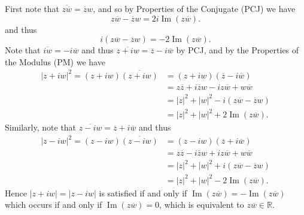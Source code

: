 \documentclass[11pt]{article}
\def\reals{\mathbb{R}}
\renewcommand{\Im}{\operatorname{Im}}
\newcommand{\abs}[1]{\left|#1\right|}
\begin{document}
\begin{enumerate}
 \begin{Solution}
  First note that $\overline{z\overline{w}} = \overline{z}w$, and so by Properties of the Conjugate (PCJ) we have
  \[
   z\overline{w} - \overline{z}w = 2i\Im(z\overline{w}).
  \]
  and thus 
  \[
   i(z\overline{w} - \overline{z}w) = -2\Im(z\overline{w}).
  \]
  Note that $\overline{iw}=-i\overline{w}$ and thus $\overline{z+iw}=\overline{z}-i\overline{w}$ by PCJ, and by the Properties of the Modulus (PM) we have
  \begin{align*}
   \abs{z+iw}^2 = (z+iw)\overline{(z+iw)} &= (z+iw)(\overline{z}-i\overline{w})\\
                                        &=z\overline{z} +i\overline{z}w-iz\overline{w} +w\overline{w}\\
                                        &=\abs{z}^2 + \abs{w}^2 -i(z\overline{w}-\overline{z}w)\\
                                        &=\abs{z}^2 + \abs{w}^2 +2\Im(z\overline{w}).
  \end{align*}
Similarly, note that $\overline{z-iw}=\overline{z}+i\overline{w}$ and thus
\begin{align*}
    \abs{z-iw}^2 = (z-iw)\overline{(z-iw)} &= (z-iw)(\overline{z}+i\overline{w})\\
                                        &=z\overline{z} -i\overline{z}w+iz\overline{w} +w\overline{w}\\
                                        &=\abs{z}^2 + \abs{w}^2 +i(z\overline{w}-\overline{z}w)\\
                                        &=\abs{z}^2 + \abs{w}^2 -2\Im(z\overline{w}).
  \end{align*}
  Hence $\abs{z+iw}=\abs{z-iw}$ is satisfied if and only if $\Im(z\overline{w}) = -\Im(z\overline{w})$ which occurs if and only if $\Im(z\overline{w})=0$, which is equivalent to $z\overline{w}\in\reals$. 
 \end{Solution}



\end{enumerate}
\end{document}
